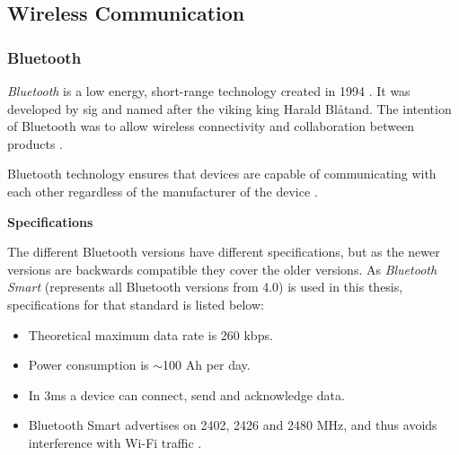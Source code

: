 \subsection{Wireless Communication}
\subsubsection{Bluetooth}
\textit{Bluetooth} is a low energy, short-range technology created in 1994 \cite{ble2016}. It was developed by \acrshort{sig} and named after the viking king Harald Blåtand. The intention of Bluetooth was to allow wireless connectivity and collaboration between products \cite{bluetoothsig2016}.


Bluetooth technology ensures that devices are capable of communicating with each other regardless of the manufacturer of the device \cite{prabhu2004}.  

\textbf{Specifications}

The different Bluetooth versions have different specifications, but as the newer versions are backwards compatible \cite{bluetoothreport2013} they cover the older versions. As \textit{Bluetooth Smart} (represents all Bluetooth versions from 4.0) is used in this thesis, specifications for that standard is listed below:

\begin{itemize}
	\item Theoretical maximum data rate is 260 kbps.
	\item Power consumption is $\sim$100 \micro Ah per day.
	\item In 3ms a device can connect, send and acknowledge data.
	\item Bluetooth Smart advertises on 2402, 2426 and 2480 MHz, and thus avoids interference with Wi-Fi traffic \cite{csr2010}.
\end{itemize}